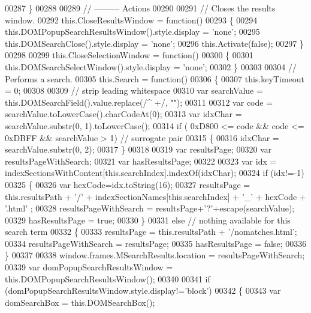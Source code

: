 \begin{DoxyCode}
00287   \}
00288 
00289   \textcolor{comment}{// --------- Actions}
00290 
00291   \textcolor{comment}{// Closes the results window.}
00292   this.CloseResultsWindow = \textcolor{keyword}{function}()
00293   \{
00294     this.DOMPopupSearchResultsWindow().style.display = \textcolor{stringliteral}{'none'};
00295     this.DOMSearchClose().style.display = \textcolor{stringliteral}{'none'};
00296     this.Activate(\textcolor{keyword}{false});
00297   \}
00298 
00299   this.CloseSelectionWindow = \textcolor{keyword}{function}()
00300   \{
00301     this.DOMSearchSelectWindow().style.display = \textcolor{stringliteral}{'none'};
00302   \}
00303 
00304   \textcolor{comment}{// Performs a search.}
00305   this.Search = \textcolor{keyword}{function}()
00306   \{
00307     this.keyTimeout = 0;
00308 
00309     \textcolor{comment}{// strip leading whitespace}
00310     var searchValue = this.DOMSearchField().value.replace(/^ +/, \textcolor{stringliteral}{""});
00311 
00312     var code = searchValue.toLowerCase().charCodeAt(0);
00313     var idxChar = searchValue.substr(0, 1).toLowerCase();
00314     \textcolor{keywordflow}{if} ( 0xD800 <= code && code <= 0xDBFF && searchValue > 1) \textcolor{comment}{// surrogate pair}
00315     \{
00316       idxChar = searchValue.substr(0, 2);
00317     \}
00318 
00319     var resultsPage;
00320     var resultsPageWithSearch;
00321     var hasResultsPage;
00322 
00323     var idx = indexSectionsWithContent[this.searchIndex].indexOf(idxChar);
00324     \textcolor{keywordflow}{if} (idx!=-1)
00325     \{
00326        var hexCode=idx.toString(16);
00327        resultsPage = this.resultsPath + \textcolor{charliteral}{'/'} + indexSectionNames[this.searchIndex] + \textcolor{charliteral}{'\_'} + hexCode + \textcolor{stringliteral}{'.html'}
      ;
00328        resultsPageWithSearch = resultsPage+\textcolor{charliteral}{'?'}+escape(searchValue);
00329        hasResultsPage = \textcolor{keyword}{true};
00330     \}
00331     \textcolor{keywordflow}{else} \textcolor{comment}{// nothing available for this search term}
00332     \{
00333        resultsPage = this.resultsPath + \textcolor{stringliteral}{'/nomatches.html'};
00334        resultsPageWithSearch = resultsPage;
00335        hasResultsPage = \textcolor{keyword}{false};
00336     \}
00337 
00338     window.frames.MSearchResults.location = resultsPageWithSearch;
00339     var domPopupSearchResultsWindow = this.DOMPopupSearchResultsWindow();
00340 
00341     \textcolor{keywordflow}{if} (domPopupSearchResultsWindow.style.display!=\textcolor{stringliteral}{'block'})
00342     \{
00343        var domSearchBox = this.DOMSearchBox();

\end{DoxyCode}
